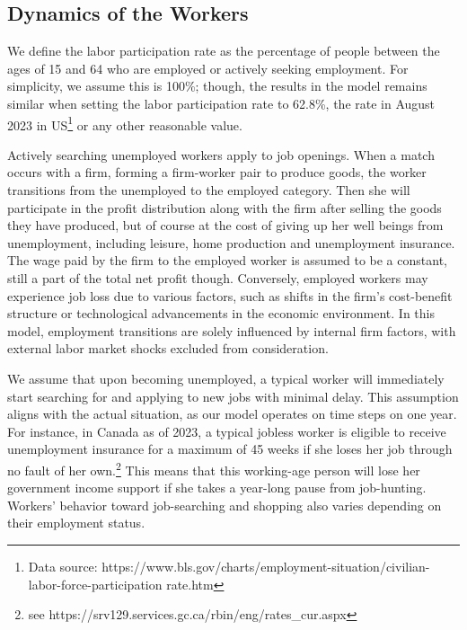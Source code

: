 \documentclass[ %
    final,
    scrbook,
    listoffigures,
    listoftables, 
    glossary]{cu-thesis}
\begin{document}
\subsection{Dynamics of the Workers}
We define the labor participation rate as the percentage of people between the ages of 15 and 64 who are employed or actively seeking employment.  For simplicity, we assume this is 100\%;
though, the results in the model remains similar when setting the labor participation rate to 62.8\%, the rate in August 2023 in US\footnote{\raggedright Data source: https://www.bls.gov/charts/employment-situation/civilian-labor-force-participation rate.htm} or any other reasonable value. 

Actively searching unemployed workers apply to job openings. When a match occurs with a firm, forming a firm-worker pair to produce goods, the worker transitions from the unemployed to the employed category. Then she will participate in the profit distribution along with the firm after selling the goods they have produced, but of course at the cost of giving up her well beings from unemployment, including leisure, home production and unemployment insurance. The wage paid by the firm to the employed worker is assumed to be a constant, still a part of the total net profit though. Conversely, employed workers may experience job loss due to various factors, such as shifts in the firm's cost-benefit structure or technological advancements in the economic environment. In this model, employment transitions are solely influenced by internal firm factors, with external labor market shocks excluded from consideration. 

We assume that upon becoming unemployed, a typical worker will immediately start searching for and applying to new jobs with minimal delay. This assumption aligns with the actual situation, as our model operates on time steps on one year. For instance, in Canada as of 2023, a typical jobless worker is eligible to receive unemployment insurance for a maximum of 45 weeks if she loses her job through no fault of her own.\footnote{see https://srv129.services.gc.ca/rbin/eng/rates\_cur.aspx}
This means that this working-age person will lose her government income support if she takes a year-long pause from job-hunting. Workers' behavior toward job-searching and shopping also varies depending on their employment status. 
\end{document}
